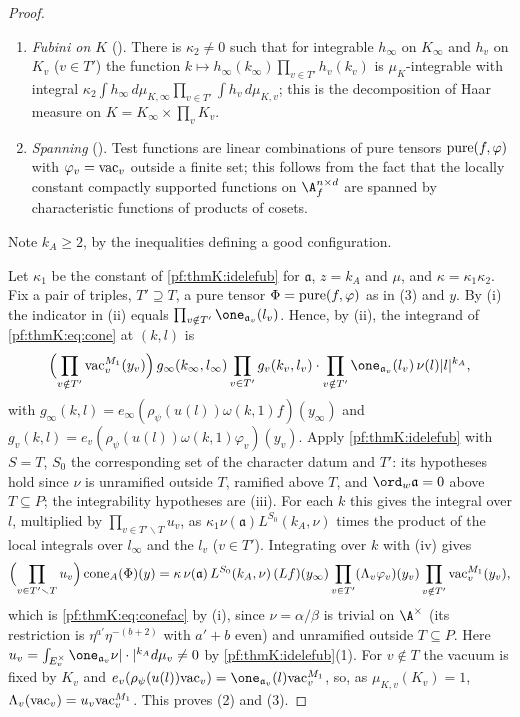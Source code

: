 \begin{proof}
\begin{enumerate}[label=(\roman*)]
absolutely and map $\thmKS$ into $\thmKS$, and the integrands are integrable over $K_v\times E_v^\times$; for $z\ge1$ the
archimedean cone integral $L$ converges absolutely, is a continuous linear map and maps the Fock space of $M$ into that of
$M_1$.
\item\emph{Fubini on $K$} (). There is $\kappa_2\ne0$ such that for
integrable $h_\infty$ on $K_\infty$ and $h_v$ on $K_v$ ($v\in T'$) the function $k\mapsto h_\infty(k_\infty)\prod_{v\in T'}
h_v(k_v)$ is $\mu_K$-integrable with integral $\kappa_2\int h_\infty\,d\mu_{K,\infty}\prod_{v\in T'}\int h_v\,d\mu_{K,v}$; this
is the decomposition of Haar measure on $K=K_\infty\times\prod_vK_v$.
\item\emph{Spanning} (). Test functions are linear combinations of
pure tensors $\operatorname{pure}(f,\varphi)$ with $\varphi_v=\mathrm{vac}_v$ outside a finite set; this follows from the fact that the
locally constant compactly supported functions on $\A_f^{n\times d}$ are spanned by characteristic functions of products of
cosets.
\end{enumerate}
Note $k_A\ge2$, by the inequalities defining a good configuration.

Let $\kappa_1$ be the constant of \cref{pf:thmK:idelefub} for $\mathfrak a$, $z=k_A$ and $\mu$, and $\kappa=\kappa_1\kappa_2$. Fix
a pair of triples, $T'\supseteq T$, a pure tensor $\Phi=\operatorname{pure}(f,\varphi)$ as in (3) and $y$. By (i) the indicator in (ii)
equals $\prod_{v\notin T'}\one_{\mathfrak a_v}(l_v)$. Hence, by (ii), the integrand of \eqref{pf:thmK:eq:cone} at $(k,l)$ is
\[
\Bigl(\prod_{v\notin T'}\thmKvac^{M_1}_v(y_v)\Bigr)\,g_\infty(k_\infty,l_\infty)\prod_{v\in T'}g_v(k_v,l_v)\cdot
\prod_{v\notin T'}\one_{\mathfrak a_v}(l_v)\,\nu(l)|l|^{k_A},
\]
with $g_\infty(k,l)=e_\infty(\rho_\psi(u(l))\omega(k,1)f)(y_\infty)$ and $g_v(k,l)=e_v(\rho_\psi(u(l))\omega(k,1)
\varphi_v)(y_v)$. Apply \cref{pf:thmK:idelefub} with $S=T$, $S_0$ the corresponding set of the character datum and $T'$: its
hypotheses hold since $\nu$ is unramified outside $T$, ramified above $T$, and $\ord_w\mathfrak a=0$ above $T\subseteq P$; the
integrability hypotheses are (iii). For each $k$ this gives the integral over $l$, multiplied by $\prod_{v\in T'\smallsetminus
T}u_v$, as $\kappa_1\nu(\mathfrak a)L^{S_0}(k_A,\nu)$ times the product of the local integrals over $l_\infty$ and the $l_v$
($v\in T'$). Integrating over $k$ with (iv) gives
\[
\Bigl(\prod_{v\in T'\smallsetminus T}u_v\Bigr)\operatorname{cone}_A(\Phi)(y)=\kappa\,\nu(\mathfrak a)\,L^{S_0}(k_A,\nu)\,(Lf)(y_\infty)
\prod_{v\in T'}(\Lambda_v\varphi_v)(y_v)\prod_{v\notin T'}\mathrm{vac}^{M_1}_v(y_v),
\]
which is \eqref{pf:thmK:eq:conefac} by (i), since $\nu=\alpha/\beta$ is trivial on $\A^\times$ (its restriction is
$\eta^{a'}\eta^{-(b+2)}$ with $a'+b$ even) and unramified outside $T\subseteq P$. Here $u_v=\int_{E_v^\times}
\one_{\mathfrak a_v}\nu|\cdot|^{k_A}d\mu_v\ne0$ by \cref{pf:thmK:idelefub}(1). For $v\notin T$ the vacuum is fixed by $K_v$
and $e_v(\rho_\psi(u(l))\thmKvac_v)=\one_{\mathfrak a_v}(l)\thmKvac^{M_1}_v$, so, as $\mu_{K,v}(K_v)=1$, $\Lambda_v(\mathrm{vac}_v)
=u_v\mathrm{vac}^{M_1}_v$. This proves (2) and (3).


\end{proof}

